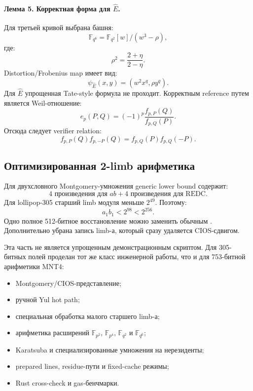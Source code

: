 \documentclass[12pt,a4paper]{article}
\newcommand{\code}[1]{\texttt{\detokenize{#1}}}
\begin{document}
\paragraph{Лемма 5. Корректная форма для $\widehat E$.}
Для третьей кривой выбрана башня:
\[
    \mathbb{F}_{q^6}
    =
    \mathbb{F}_{q^2}[w]/(w^3-\rho),
\]
где:
\[
    \rho^2=\frac{2+\eta}{2-\eta}.
\]
Distortion/Frobenius map имеет вид:
\[
    \psi_{\widehat E}(x,y)=(w^2x^q,\rho y^q).
\]
Для $\widehat E$ упрощенная Tate-style формула не проходит. Корректным
reference путем является Weil-отношение:
\[
    e_p(P,Q)
    =
    (-1)^p\frac{f_{p,P}(Q)}{f_{p,Q}(P)}.
\]
Отсюда следует verifier relation:
\[
    f_{p,P}(Q)f_{p,-P}(Q)
    =
    f_{p,Q}(P)f_{p,Q}(-P).
\]

\subsection{Оптимизированная 2-limb арифметика}

Для двухсловного Montgomery-умножения generic lower bound содержит:
\[
    4\text{ произведения для }ab+
    4\text{ произведения для REDC}.
\]
Для lollipop-305 старший limb модуля меньше $2^{49}$. Поэтому:
\[
    a_1b_1<2^{98}<2^{256}.
\]
Одно полное 512-битное восстановление можно заменить обычным \code{MUL}.
Дополнительно убрана запись limb-а, который сразу удаляется CIOS-сдвигом.

Эта часть не является упрощенным демонстрационным скриптом. Для 305-битных
полей проделан тот же класс инженерной работы, что и для 753-битной
арифметики MNT4:
\begin{itemize}
    \item Montgomery/CIOS-представление;
    \item ручной Yul hot path;
    \item специальная обработка малого старшего limb-а;
    \item арифметика расширений $\mathbb{F}_{p^2}$,
    $\mathbb{F}_{p^4}$, $\mathbb{F}_{q^2}$ и $\mathbb{F}_{q^6}$;
    \item Karatsuba и специализированные умножения на нерезиденты;
    \item prepared lines, residue-пути и fixed-cache режимы;
    \item Rust cross-check и gas-бенчмарки.
\end{itemize}
\end{document}
